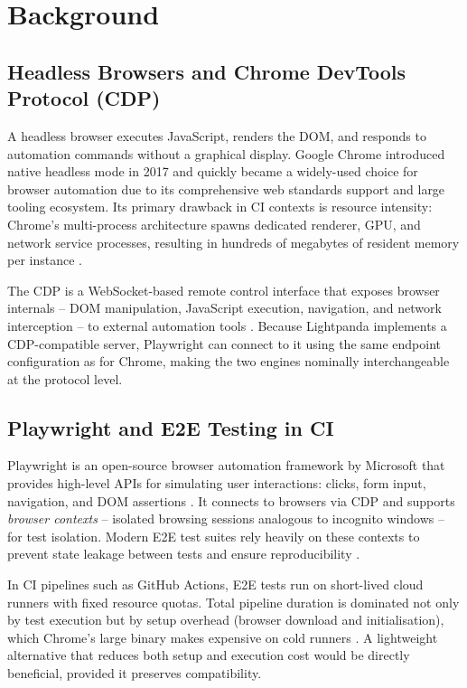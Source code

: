 \section{Background}
\label{sec:background}

\subsection{Headless Browsers and Chrome DevTools Protocol (CDP)}

A headless browser executes JavaScript, renders the DOM, and responds to automation commands without a graphical display. Google Chrome introduced native headless mode in 2017 and quickly became a widely-used choice for browser automation due to its comprehensive web standards support and large tooling ecosystem. Its primary drawback in CI contexts is resource intensity: Chrome's multi-process architecture spawns dedicated renderer, GPU, and network service processes, resulting in hundreds of megabytes of resident memory per instance \cite{reis2009isolating}.

The CDP is a WebSocket-based remote control interface that exposes browser internals -- DOM manipulation, JavaScript execution, navigation, and network interception -- to external automation tools \cite{cdp2024}. Because Lightpanda implements a CDP-compatible server, Playwright can connect to it using the same endpoint configuration as for Chrome, making the two engines nominally interchangeable at the protocol level.

\subsection{Playwright and E2E Testing in CI}

Playwright is an open-source browser automation framework by Microsoft that provides high-level APIs for simulating user interactions: clicks, form input, navigation, and DOM assertions \cite{playwright2024}. It connects to browsers via CDP and supports \emph{browser contexts} -- isolated browsing sessions analogous to incognito windows -- for test isolation. Modern E2E test suites rely heavily on these contexts to prevent state leakage between tests and ensure reproducibility \cite{playwright2024}.

In CI pipelines such as GitHub Actions, E2E tests run on short-lived cloud runners with fixed resource quotas. Total pipeline duration is dominated not only by test execution but by setup overhead (browser download and initialisation), which Chrome's large binary makes expensive on cold runners \cite{hilton2016usage}. A lightweight alternative that reduces both setup and execution cost would be directly beneficial, provided it preserves compatibility.

